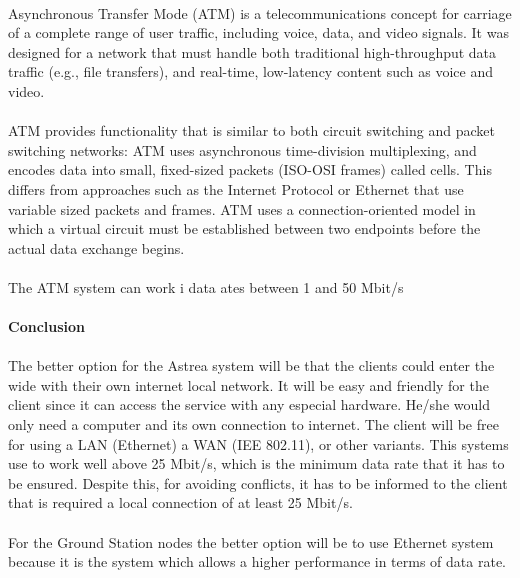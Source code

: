\paragraph{} 
Asynchronous Transfer Mode (ATM) is a telecommunications concept for carriage of a complete range of user traffic, including voice, data, and video signals. It was designed for a network that must handle both traditional high-throughput data traffic (e.g., file transfers), and real-time, low-latency content such as voice and video. 
\paragraph{}
ATM provides functionality that is similar to both circuit switching and packet switching networks: ATM uses asynchronous time-division multiplexing, and encodes data into small, fixed-sized packets (ISO-OSI frames) called cells. This differs from approaches such as the Internet Protocol or Ethernet that use variable sized packets and frames. ATM uses a connection-oriented model in which a virtual circuit must be established between two endpoints before the actual data exchange begins.
\paragraph{}
The ATM system can work i data ates between 1 and 50 Mbit/s

\paragraph{} \textbf{Conclusion}
\paragraph{}
The better option for the Astrea system will be that the clients could enter the wide with their own internet local network. It will be easy and friendly for the client since it can access the service with any especial hardware. He/she would only need a computer and its own connection to internet. The client will be free for using a LAN (Ethernet) a WAN (IEE 802.11), or other variants. This systems use to work well above 25 Mbit/s, which is the minimum data rate that it has to be ensured. Despite this, for avoiding conflicts, it has to be informed to the client that is required a local connection of at least 25 Mbit/s.
\paragraph{}
For the Ground Station nodes the better option will be to use Ethernet system because it is the system which allows a higher performance in terms of data rate.


